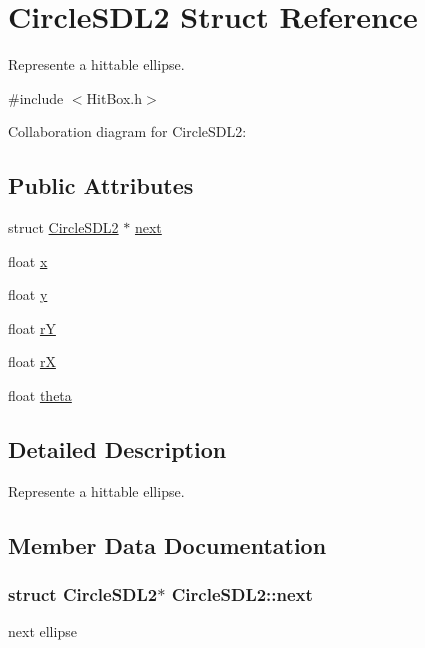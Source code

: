 \hypertarget{structCircleSDL2}{}\section{Circle\+S\+D\+L2 Struct Reference}
\label{structCircleSDL2}


Represente a hittable ellipse.  




{\ttfamily \#include $<$Hit\+Box.\+h$>$}



Collaboration diagram for Circle\+S\+D\+L2\+:
\subsection*{Public Attributes}
\begin{DoxyCompactItemize}
\item 
struct \hyperlink{structCircleSDL2}{Circle\+S\+D\+L2} $\ast$ \hyperlink{structCircleSDL2_ac39c89f7e034b21161bbacf6e4a2c1ea}{next}
\item 
float \hyperlink{structCircleSDL2_ad235379713c16cff4df569ebd818aa4e}{x}
\item 
float \hyperlink{structCircleSDL2_a52d1cb29f05a93e3f127e1956a9714ec}{y}
\item 
float \hyperlink{structCircleSDL2_a5efd23d10522c9e2876ee3680bd9d73a}{rY}
\item 
float \hyperlink{structCircleSDL2_a3e1bbbd4b8e28aaa64d556b5d44c38c7}{rX}
\item 
float \hyperlink{structCircleSDL2_aa6558f4c810b4ef38b1c5bc7cac27634}{theta}
\end{DoxyCompactItemize}


\subsection{Detailed Description}
Represente a hittable ellipse. 

\subsection{Member Data Documentation}
\subsubsection[{\texorpdfstring{next}{next}}]{\setlength{\rightskip}{0pt plus 5cm}struct {\bf Circle\+S\+D\+L2}$\ast$ Circle\+S\+D\+L2\+::next}\hypertarget{structCircleSDL2_ac39c89f7e034b21161bbacf6e4a2c1ea}{}\label{structCircleSDL2_ac39c89f7e034b21161bbacf6e4a2c1ea}
next ellipse 
